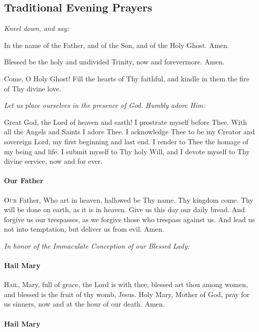 \documentclass[9pt]{article}
\begin{document}
\begin{multicols}{3}

\section*{Traditional Evening Prayers}

\textit{Kneel down, and say:}

In the name of the Father, and of the Son, and of the Holy Ghost.  Amen.

Blessed be the holy and undivided Trinity, now and forevermore.  Amen.

Come, O Holy Ghost! Fill the hearts of Thy faithful, and kindle in them the fire
of Thy divine love.

\textit{Let us place ourselves in the presence of God.  Humbly adore Him:}

Great God, the Lord of heaven and earth!  I prostrate myself before Thee.
With all the Angels and Saints I adore Thee.  I acknowledge Thee to be my
Creator and sovereign Lord, my first beginning and last end.  I render to Thee
the homage of my being and life.  I submit myself to Thy holy Will, and I devote
myself to Thy divine service, now and for ever.

\paragraph{Our Father}

\textsc{Our} Father, Who art in heaven, hallowed be Thy name.
Thy kingdom come.  Thy will be done on earth, as it is in heaven.
Give us this day our daily bread.  And forgive us our trespasses,
as we forgive those who trespass against us.  And lead us not
into temptation, but deliver us from evil.  Amen.

\textit{In honor of the Immaculate Conception of our Blessed Lady:}

\paragraph{Hail Mary}

\textsc{Hail}, Mary, full of grace, the Lord is with thee;
blessed art thou among women, and blessed is the fruit of
thy womb, Jesus.  Holy Mary, Mother of God, pray for us sinners,
now and at the hour of our death. Amen.

\paragraph{Hail Mary}


\end{multicols}
\end{document}
